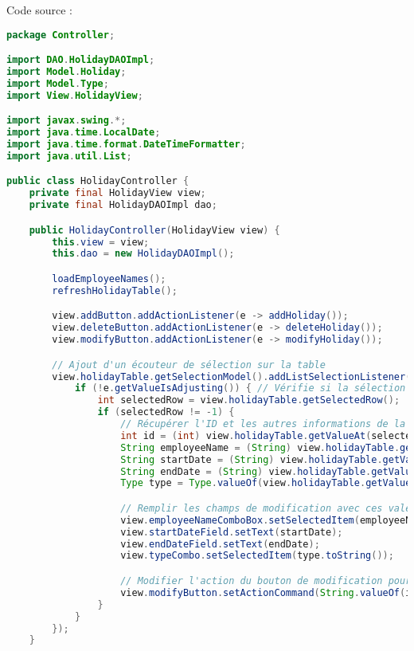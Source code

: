 \documentclass[a4paper,12pt]{article}
\begin{document}
Code source :
\begin{lstlisting}[language=Java]
package Controller;

import DAO.HolidayDAOImpl;
import Model.Holiday;
import Model.Type;
import View.HolidayView;

import javax.swing.*;
import java.time.LocalDate;
import java.time.format.DateTimeFormatter;
import java.util.List;

public class HolidayController {
    private final HolidayView view;
    private final HolidayDAOImpl dao;

    public HolidayController(HolidayView view) {
        this.view = view;
        this.dao = new HolidayDAOImpl();

        loadEmployeeNames();
        refreshHolidayTable();

        view.addButton.addActionListener(e -> addHoliday());
        view.deleteButton.addActionListener(e -> deleteHoliday());
        view.modifyButton.addActionListener(e -> modifyHoliday());

        // Ajout d'un écouteur de sélection sur la table
        view.holidayTable.getSelectionModel().addListSelectionListener(e -> {
            if (!e.getValueIsAdjusting()) { // Vérifie si la sélection est terminée
                int selectedRow = view.holidayTable.getSelectedRow();
                if (selectedRow != -1) {
                    // Récupérer l'ID et les autres informations de la ligne sélectionnée
                    int id = (int) view.holidayTable.getValueAt(selectedRow, 0); // Récupère l'ID depuis la colonne 0
                    String employeeName = (String) view.holidayTable.getValueAt(selectedRow, 1);
                    String startDate = (String) view.holidayTable.getValueAt(selectedRow, 2);
                    String endDate = (String) view.holidayTable.getValueAt(selectedRow, 3);
                    Type type = Type.valueOf(view.holidayTable.getValueAt(selectedRow, 4).toString());

                    // Remplir les champs de modification avec ces valeurs
                    view.employeeNameComboBox.setSelectedItem(employeeName);
                    view.startDateField.setText(startDate);
                    view.endDateField.setText(endDate);
                    view.typeCombo.setSelectedItem(type.toString());

                    // Modifier l'action du bouton de modification pour utiliser l'ID de la ligne sélectionnée
                    view.modifyButton.setActionCommand(String.valueOf(id));
                }
            }
        });
    }


\end{lstlisting}
\end{document}
